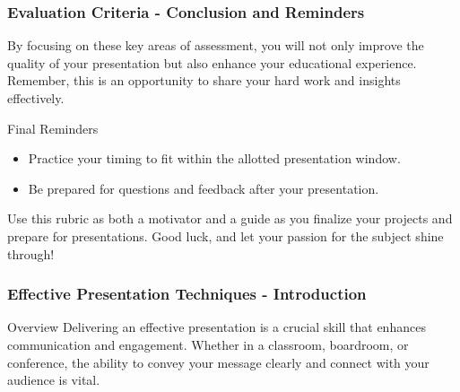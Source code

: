 \documentclass[aspectratio=169]{beamer}
\begin{document}
\begin{frame}[fragile]
    \frametitle{Evaluation Criteria - Conclusion and Reminders}
    By focusing on these key areas of assessment, you will not only improve the quality of your presentation but also enhance your educational experience. Remember, this is an opportunity to share your hard work and insights effectively.
    
    \begin{block}{Final Reminders}
        \begin{itemize}
            \item Practice your timing to fit within the allotted presentation window.
            \item Be prepared for questions and feedback after your presentation.
        \end{itemize}
    \end{block}

    Use this rubric as both a motivator and a guide as you finalize your projects and prepare for presentations. Good luck, and let your passion for the subject shine through!
\end{frame}

\begin{frame}[fragile]
    \frametitle{Effective Presentation Techniques - Introduction}
    \begin{block}{Overview}
        Delivering an effective presentation is a crucial skill that enhances communication and engagement. 
        Whether in a classroom, boardroom, or conference, the ability to convey your message clearly and connect with your audience is vital.
    \end{block}
\end{frame}
\end{document}
